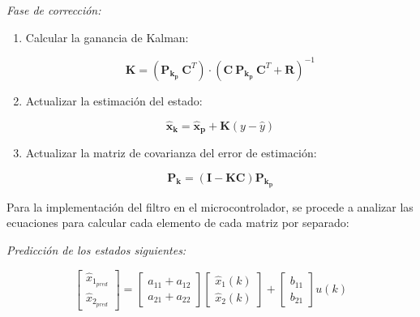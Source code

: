 \textit{Fase de corrección:}
\begin{enumerate}
    \item Calcular la ganancia de Kalman:

    \vspace{-0.5cm}
    \begin{equation}
        \mathbf{K} = (\mathbf{P_{k_p}}\ \textbf{C}^T) \cdot ({\textbf{C}\ \mathbf{P_{k_p}}\ \textbf{C}^T + \textbf{R}})^{-1}
    \end{equation}
    \vspace{-0.5cm}

    \item Actualizar la estimación del estado:
    
    \vspace{-0.5cm}
    \begin{equation}
        \mathbf{\hat{x}_k} = \mathbf{\hat{x}_p} + \mathbf{K} (y - \hat{y})
    \end{equation}
    \vspace{-0.5cm}

    \item Actualizar la matriz de covarianza del error de estimación:
    
    \vspace{-0.5cm}
    \begin{equation}
        \mathbf{P_k} = (\textbf{I} - \mathbf{K} \mathbf{C}) \mathbf{P_{k_p}}
    \end{equation}
    \vspace{-0.5cm}
\end{enumerate}

Para la implementación del filtro en el microcontrolador, se procede a analizar las ecuaciones para calcular cada elemento
de cada matriz por separado:

\textit{Predicción de los estados siguientes:}

\vspace{-0.5cm}
\begin{equation}
    \begin{bmatrix}
        \hat{x}_{1_{pred}} \\
        \hat{x}_{2_{pred}} 
    \end{bmatrix}
    =
    \begin{bmatrix}
        a_{11} + a_{12} \\
        a_{21} + a_{22}
    \end{bmatrix}
    \begin{bmatrix}
        \hat{x}_{1}(k) \\
        \hat{x}_{2}(k)
    \end{bmatrix}
    +
    \begin{bmatrix}
        b_{11} \\
        b_{21}
    \end{bmatrix}
    u(k)
\end{equation}
\vspace{-0.5cm}

